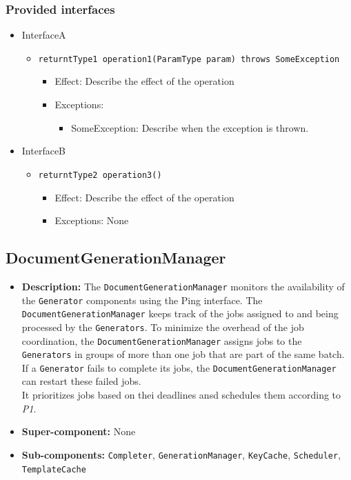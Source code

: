 \documentclass[a4paper,10pt]{article}
\begin{document}
\subsubsection*{Provided interfaces}
\begin{itemize}
    \item InterfaceA
    \begin{itemize}
        \item \texttt{returntType1 operation1(ParamType param) throws SomeException}
        \begin{itemize}
            \item Effect: Describe the effect of the operation
            \item Exceptions:
            \begin{itemize}
                \item SomeException: Describe when the exception is thrown.
            \end{itemize}
        \end{itemize}
    \end{itemize}

    \item InterfaceB
    \begin{itemize}
        \item \texttt{returntType2 operation3()}
        \begin{itemize}
            \item Effect: Describe the effect of the operation
            \item Exceptions: None
        \end{itemize}
    \end{itemize}
\end{itemize}

\subsection{DocumentGenerationManager}
\begin{itemize}
    \item \textbf{Description:} The \texttt{DocumentGenerationManager} monitors the availability of the \texttt{Generator} components using the Ping interface. The \texttt{DocumentGenerationManager} keeps track of the jobs assigned to and being processed by the \texttt{Generators}. To minimize the overhead of the job coordination, the \texttt{DocumentGenerationManager} assigns jobs to the \texttt{Generators} in groups of more than one job that are part of the same batch. If a \texttt{Generator} fails to complete its jobs, the \texttt{DocumentGenerationManager} can restart these failed jobs. \\ It prioritizes jobs based on thei deadlines ansd schedules them according to \emph{P1}.
    \item \textbf{Super-component:} None
    \item \textbf{Sub-components:} \texttt{Completer}, \texttt{GenerationManager}, \texttt{KeyCache}, \texttt{Scheduler}, \texttt{TemplateCache}
\end{itemize}
\end{document}
